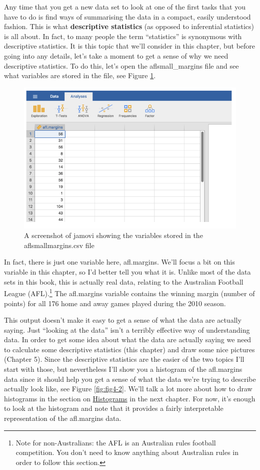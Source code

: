 \documentclass[
]{book}
\begin{document}
Any time that you get a new data set to look at one of the first tasks that you have to do is find ways of summarising the data in a compact, easily understood fashion. This is what \textbf{descriptive statistics} (as opposed to inferential statistics) is all about. In fact, to many people the term ``statistics'' is synonymous with descriptive statistics. It is this topic that we'll consider in this chapter, but before going into any details, let's take a moment to get a sense of why we need descriptive statistics. To do this, let's open the aflsmall\_margins file and see what variables are stored in the file, see Figure \ref{fig:fig4-1}.

\begin{figure}
\includegraphics[width=0.9\linewidth]{images/Figure8} \caption{A screenshot of jamovi showing the variables stored in the aflsmallmargins.csv file}\label{fig:fig4-1}
\end{figure}

In fact, there is just one variable here, afl.margins. We'll focus a bit on this variable in this chapter, so I'd better tell you what it is. Unlike most of the data sets in this book, this is actually real data, relating to the Australian Football League (AFL).\footnote{Note for non-Australians: the AFL is an Australian rules football competition. You don't need to know anything about Australian rules in order to follow this section.} The afl.margins variable contains the winning margin (number of points) for all 176 home and away games played during the 2010 season.

This output doesn't make it easy to get a sense of what the data are actually saying. Just ``looking at the data'' isn't a terribly effective way of understanding data. In order to get some idea about what the data are actually saying we need to calculate some descriptive statistics (this chapter) and draw some nice pictures (Chapter 5). Since the descriptive statistics are the easier of the two topics I'll start with those, but nevertheless I'll show you a histogram of the afl.margins data since it should help you get a sense of what the data we're trying to describe actually look like, see Figure \ref{fig:fig4-2}. We'll talk a lot more about how to draw histograms in the section on \protect\hyperlink{histograms}{Histograms} in the next chapter. For now, it's enough to look at the histogram and note that it provides a fairly interpretable representation of the afl.margins data.
\end{document}
